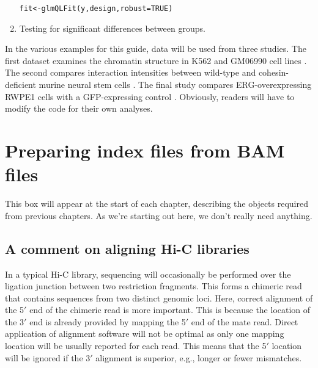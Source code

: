 \documentclass{report}\usepackage[]{graphicx}\usepackage[usenames,dvipsnames]{color}
\newcommand{\hlnum}[1]{\textcolor[rgb]{0.816,0.125,0.439}{#1}}%
\newcommand{\hlopt}[1]{\textcolor[rgb]{0,0,0}{#1}}%
\newcommand{\hlstd}[1]{\textcolor[rgb]{0.251,0.251,0.251}{#1}}%
\newcommand{\hlkwb}[1]{\textcolor[rgb]{0,0,0}{#1}}%
\newcommand{\hlkwc}[1]{\textcolor[rgb]{0.251,0.251,0.251}{#1}}%
\newcommand{\hlkwd}[1]{\textcolor[rgb]{0.878,0.439,0.125}{#1}}%
\newenvironment{knitrout}{}{} %
\newenvironment{combox}
{ \definecolor{shadecolor}{RGB}{255, 240, 240} \begin{shaded}\begin{center}\begin{minipage}[t]{0.95\textwidth} }
{ \end{minipage}\end{center}\end{shaded} \definecolor{shadecolor}{RGB}{240,240,240} }
\begin{document}
\begin{enumerate}
\begin{knitrout}
\begin{kframe}
\begin{alltt}
\hlstd{fit} \hlkwb{<-} \hlkwd{glmQLFit}\hlstd{(y, design,} \hlkwc{robust}\hlstd{=}\hlnum{TRUE}\hlstd{)}
\end{alltt}
\end{kframe}
\end{knitrout}
\item Testing for significant differences between groups.
\begin{knitrout}
\color{fgcolor}
\end{knitrout}
\end{enumerate}
In the various examples for this guide, data will be used from three studies. 
The first dataset examines the chromatin structure in K562 and GM06990 cell lines \cite{lieberman2009comprehensive}.
The second compares interaction intensities between wild-type and cohesin-deficient murine neural stem cells \cite{sofueva2013cohesin}. 
The final study compares ERG-overexpressing RWPE1 cells with a GFP-expressing control \cite{rickman2012oncogene}.
Obviously, readers will have to modify the code for their own analyses.

\chapter{Preparing index files from BAM files}
\label{chap:prep} 

\begin{combox}
This box will appear at the start of each chapter, describing the objects required from previous chapters.
As we're starting out here, we don't really need anything.
\end{combox}

\section{A comment on aligning Hi-C libraries}
\label{sec:align}

In a typical Hi-C library, sequencing will occasionally be performed over the ligation junction between two restriction fragments.
This forms a chimeric read that contains sequences from two distinct genomic loci.
Here, correct alignment of the 5$'$ end of the chimeric read is more important.
This is because the location of the 3$'$ end is already provided by mapping the 5$'$ end of the mate read.
Direct application of alignment software will not be optimal as only one mapping location will be usually reported for each read.
This means that the 5$'$ location will be ignored if the 3$'$ alignment is superior, e.g., longer or fewer mismatches.
\end{document}
